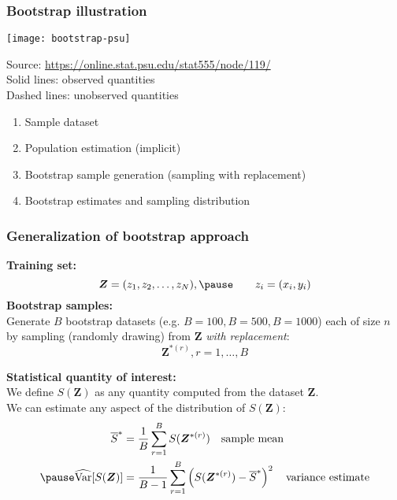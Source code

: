 \documentclass[smaller]{beamer}
\newcommand{\lt}{\left}
\newcommand{\rt}{\right}
\newcommand{\?}{\stackrel{?}{=}}
\newcommand{\fr}{\frac}
\newcommand{\ol}{\overline}
\begin{document}
\begin{frame}
  \frametitle{Bootstrap illustration}

  \begin{minipage}{.78\linewidth}
    \texttt{[image: bootstrap-psu]}
    
    {\tiny Source: \url{https://online.stat.psu.edu/stat555/node/119/}}\\
    {\footnotesize Solid lines: observed quantities\\
    Dashed lines: unobserved quantities}
  \end{minipage}
  \begin{minipage}{.2\linewidth}\small
    \begin{enumerate}
    \item Sample dataset
    \item Population estimation (implicit)
    \item Bootstrap sample generation (sampling with replacement)
    \item Bootstrap estimates and sampling distribution
    \end{enumerate}
  \end{minipage}
\end{frame}




\begin{frame}
  \frametitle{Generalization of bootstrap approach}
  \textbf{Training set:}\\\pause
  \begin{equation}
    \bm Z = (z_1, z_2, \ldots, z_N),\pause \qquad z_i = (x_i,y_i)
  \end{equation}
  \pause  
  \textbf{Bootstrap samples:}\\\pause
  Generate $B$ bootstrap datasets (e.g. $B=100, B=500, B=1000$) each of size $n$
  by sampling (randomly drawing) from $\bm Z$ \textit{with replacement}:\pause
  \begin{equation}
    \bm Z^{*(r)}, r = 1, \ldots, B
  \end{equation}
  \pause
  
  \textbf{Statistical quantity of interest:}\\\pause
  We define $S(\bm Z)$ as any quantity computed from the dataset $\bm Z$. \\ \pause
  We can estimate any aspect of the distribution of $S(\bm Z)$:\pause
  \begin{align}
    \ol{S}^* &= \fr1B\sum_{r=1}^B S(\bm Z^{*(r)}) \quad \text{sample mean}\\\pause
    \widehat{\text{Var}}[S(\bm Z)] &= \fr{1}{B-1}\sum_{r=1}^B \lt(S(\bm Z^{*(r)}) - \ol{S}^*\rt)^2 \quad \text{variance estimate}
  \end{align}
\end{frame}
\end{document}
